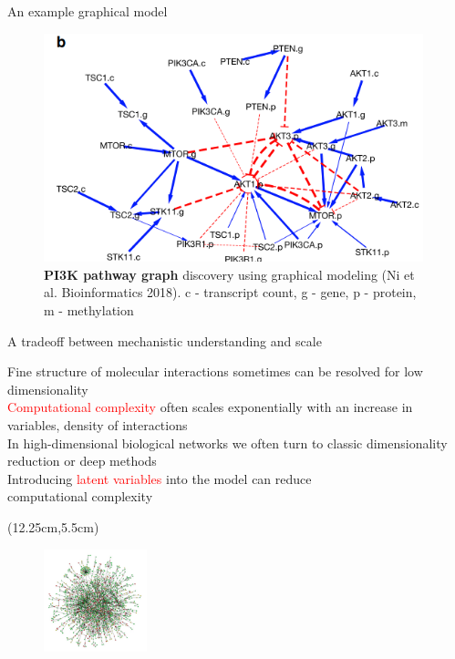 \documentclass[aspectratio=1610]{beamer}					%
\begin{document}
\begin{frame}{An example graphical model}

\begin{figure}
\includegraphics[width=11cm]{pi3k-pathway.png}
\caption{\textbf{PI3K pathway graph} discovery using graphical modeling (Ni et al. Bioinformatics 2018). c - transcript count, g - gene, p - protein, m - methylation}
\end{figure}
\end{frame}

\begin{frame}{A tradeoff between mechanistic understanding and scale}

Fine structure of molecular interactions sometimes can be resolved for low dimensionality\\
\vspace{0.2in}
\textcolor{red}{Computational complexity} often scales exponentially with an increase in variables, density of interactions\\
\vspace{0.2in}
In high-dimensional biological networks we often turn to classic dimensionality reduction or deep methods\\
\vspace{0.2in}
Introducing \textcolor{red}{latent variables} into the model can reduce \\computational complexity


\begin{textblock*}{3cm}(12.25cm,5.5cm)
\begin{figure}
\includegraphics[width=3cm]{net.png}
\end{figure}
\end{textblock*}

\end{frame}
\end{document}
